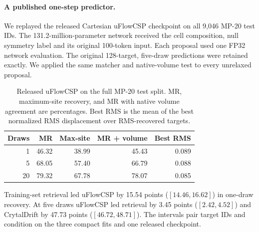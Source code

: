 \paragraph{A published one-step predictor.}
We replayed the released Cartesian uFlowCSP checkpoint \cite{uflow} on all 9,046 MP-20 test IDs. The 131.2-million-parameter network received the cell composition, null symmetry label and its original 100-token input. Each proposal used one FP32 network evaluation. The original 128-target, five-draw predictions were retained exactly. We applied the same matcher and native-volume test to every unrelaxed proposal.

\begin{table}[!htbp]\centering\small
\caption{Released uFlowCSP on the full MP-20 test split. MR, maximum-site recovery, and MR with native volume agreement are percentages. Best RMS is the mean of the best normalized RMS displacement over RMS-recovered targets.}\label{t:revision-external-full}
\begin{tabular}{rrrrr}\hline
Draws & MR & Max-site & MR + volume & Best RMS\\\hline
1 & 46.32 & 38.99 & 45.43 & 0.089\\
5 & 68.05 & 57.40 & 66.79 & 0.088\\
20 & 79.32 & 67.78 & 78.07 & 0.085\\
\hline\end{tabular}\end{table}

Training-set retrieval led uFlowCSP by 15.54 points ($[14.46,16.62]$) in one-draw recovery. At five draws uFlowCSP led retrieval by 3.45 points ($[2.42,4.52]$) and CrytalDrift by 47.73 points ($[46.72,48.71]$). The intervals pair target IDs and condition on the three compact fits and one released checkpoint.
